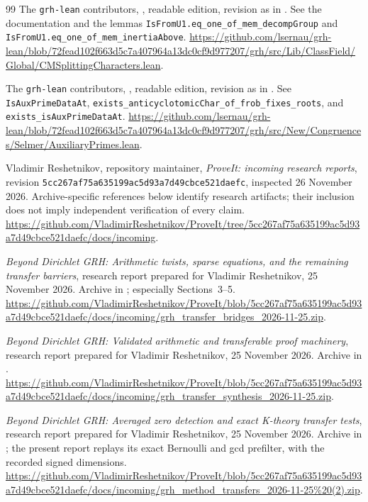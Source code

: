\begin{thebibliography}{99}
The \texttt{grh-lean} contributors,
,
readable edition, revision as in \cite{repo}.
See the documentation and the lemmas
\texttt{IsFromU1.eq\_one\_of\_mem\_decompGroup} and
\texttt{IsFromU1.eq\_one\_of\_mem\_inertiaAbove}.
\url{https://github.com/lsernau/grh-lean/blob/72fead102f663d5c7a407964a13dc0cf9d977207/grh/src/Lib/ClassField/Global/CMSplittingCharacters.lean}.

The \texttt{grh-lean} contributors,
,
readable edition, revision as in \cite{repo}.
See \texttt{IsAuxPrimeDataAt},
\texttt{exists\_anticyclotomicChar\_of\_frob\_fixes\_roots}, and
\texttt{exists\_isAuxPrimeDataAt}.
\url{https://github.com/lsernau/grh-lean/blob/72fead102f663d5c7a407964a13dc0cf9d977207/grh/src/New/Congruences/Selmer/AuxiliaryPrimes.lean}.

Vladimir Reshetnikov, repository maintainer,
\emph{ProveIt: incoming research reports},
revision \texttt{5cc267af75a635199ac5d93a7d49cbce521daefc},
inspected 26 November 2026.
Archive-specific references below identify research artifacts;
their inclusion does not imply independent verification of every claim.
\url{https://github.com/VladimirReshetnikov/ProveIt/tree/5cc267af75a635199ac5d93a7d49cbce521daefc/docs/incoming}.

\emph{Beyond Dirichlet GRH: Arithmetic twists, sparse equations,
and the remaining transfer barriers},
research report prepared for Vladimir Reshetnikov,
25 November 2026.
Archive  in \cite{incoming};
especially Sections~3--5.
\url{https://github.com/VladimirReshetnikov/ProveIt/blob/5cc267af75a635199ac5d93a7d49cbce521daefc/docs/incoming/grh_transfer_bridges_2026-11-25.zip}.

\emph{Beyond Dirichlet GRH: Validated arithmetic and transferable
proof machinery},
research report prepared for Vladimir Reshetnikov,
25 November 2026.
Archive  in
\cite{incoming}.
\url{https://github.com/VladimirReshetnikov/ProveIt/blob/5cc267af75a635199ac5d93a7d49cbce521daefc/docs/incoming/grh_transfer_synthesis_2026-11-25.zip}.

\emph{Beyond Dirichlet GRH: Averaged zero detection and exact
K-theory transfer tests},
research report prepared for Vladimir Reshetnikov,
25 November 2026.
Archive  in
\cite{incoming}; the present report replays its exact Bernoulli and
gcd prefilter, with the recorded signed dimensions.
\url{https://github.com/VladimirReshetnikov/ProveIt/blob/5cc267af75a635199ac5d93a7d49cbce521daefc/docs/incoming/grh_method_transfers_2026-11-25%20(2).zip}.


\end{thebibliography}
